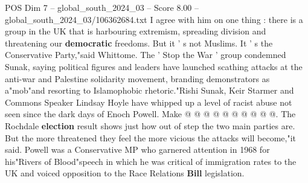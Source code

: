 \begin{textsample}{POS Dim 7 – global\_south\_2024\_03 – Score 8.00 – global\_south\_2024\_03/106362684.txt}
I agree with him on one thing : there is a group in the UK that is harbouring extremism, spreading division and threatening our \textbf{democratic} freedoms.
But it ' s not Muslims.
It ' s the Conservative Party,"said Whittome.
The ' Stop the War ' group condemned Sunak, saying political figures and leaders have launched scathing attacks at the anti-war and Palestine solidarity movement, branding demonstrators as a"mob"and resorting to Islamophobic rhetoric."Rishi Sunak, Keir Starmer and Commons Speaker Lindsay Hoyle have whipped up a level of racist abuse not seen since the dark days of Enoch Powell.
Make @ @ @ @ @ @ @ @ @ @.
The Rochdale \textbf{election} result shows just how out of step the two main parties are.
But the more threatened they feel the more vicious the attacks will become,"it said.
Powell was a Conservative MP who garnered attention in 1968 for his"Rivers of Blood"speech in which he was critical of immigration rates to the UK and voiced opposition to the Race Relations \textbf{Bill} legislation.

\end{textsample}

